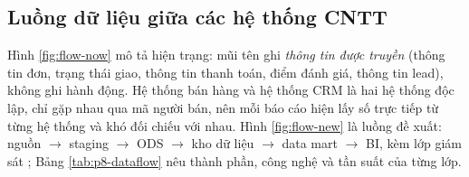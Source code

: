 \subsection{Luồng dữ liệu giữa các hệ thống CNTT}\label{sec:dataflow}
Hình \ref{fig:flow-now} mô tả hiện trạng: mũi tên ghi \emph{thông tin được truyền} (thông tin đơn, trạng thái giao, thông tin thanh toán, điểm đánh giá, thông tin lead), không ghi hành động. Hệ thống bán hàng và hệ thống CRM là hai hệ thống độc lập, chỉ gặp nhau qua mã người bán, nên mỗi báo cáo hiện lấy số trực tiếp từ từng hệ thống và khó đối chiếu với nhau.
Hình \ref{fig:flow-new} là luồng đề xuất: nguồn $\rightarrow$ staging $\rightarrow$ ODS $\rightarrow$ kho dữ liệu $\rightarrow$ data mart $\rightarrow$ BI, kèm lớp giám sát ; Bảng \ref{tab:p8-dataflow} nêu thành phần, công nghệ và tần suất của từng lớp.

